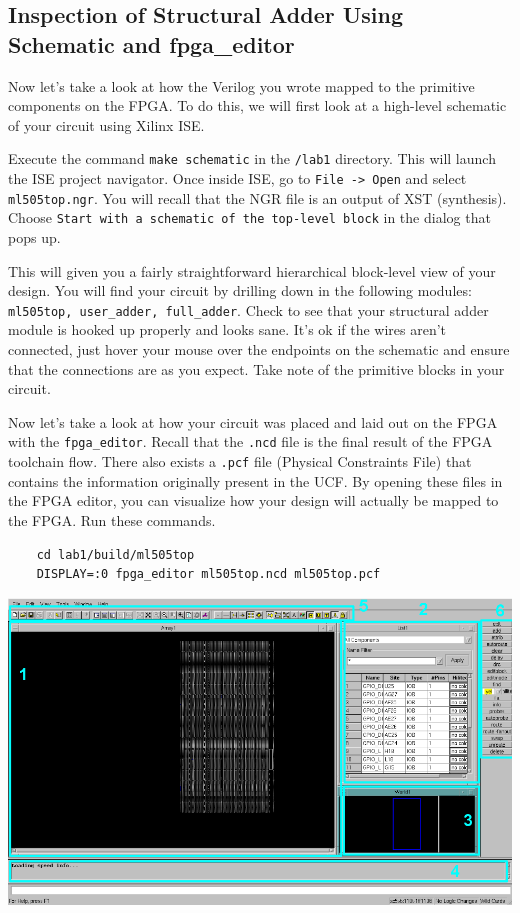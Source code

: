 \documentclass[11pt]{article}
\begin{document}
\subsection{Inspection of Structural Adder Using Schematic and fpga\_editor}
Now let's take a look at how the Verilog you wrote mapped to the primitive components on the FPGA. To do this, we will first look at a high-level schematic of your circuit using Xilinx ISE.

Execute the command \verb|make schematic| in the \verb|/lab1| directory. This will launch the ISE project navigator. Once inside ISE, go to \verb|File -> Open| and select \verb|ml505top.ngr|. You will recall that the NGR file is an output of XST (synthesis). Choose \verb|Start with a schematic of the top-level block| in the dialog that pops up.

This will given you a fairly straightforward hierarchical block-level view of your design. You will find your circuit by drilling down in the following modules: \verb|ml505top, user_adder, full_adder|. Check to see that your structural adder module is hooked up properly and looks sane. It's ok if the wires aren't connected, just hover your mouse over the endpoints on the schematic and ensure that the connections are as you expect. Take note of the primitive blocks in your circuit.

Now let's take a look at how your circuit was placed and laid out on the FPGA with the \verb|fpga_editor|. Recall that the \verb|.ncd| file is the final result of the FPGA toolchain flow. There also exists a \verb|.pcf| file (Physical Constraints File) that contains the information originally present in the UCF. By opening these files in the FPGA editor, you can visualize how your design will actually be mapped to the FPGA. Run these commands.

\begin{verbatim}
	cd lab1/build/ml505top
	DISPLAY=:0 fpga_editor ml505top.ncd ml505top.pcf
\end{verbatim}

\begin{center}
	\includegraphics[width=\textwidth]{images/fpga_editor_1.png}
\end{center}
\end{document}

